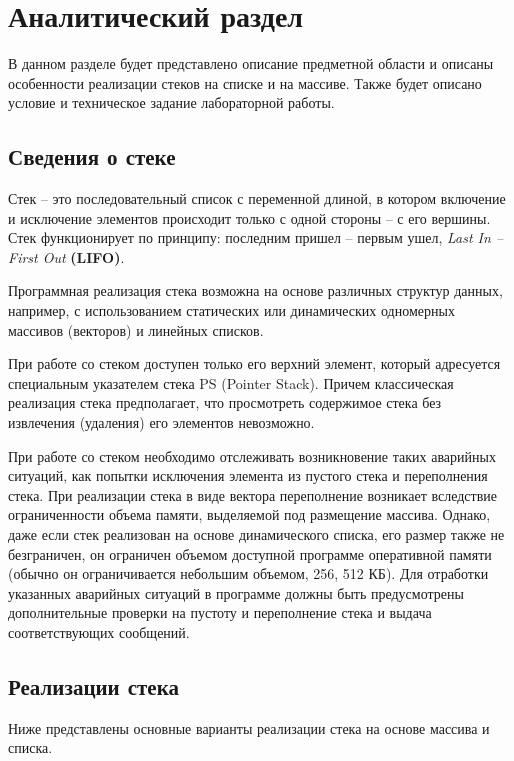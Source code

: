 \chapter{Аналитический раздел}

В данном разделе будет представлено описание предметной области и описаны особенности реализации стеков на списке и на массиве. Также будет описано условие и техническое задание лабораторной работы.

\section{Сведения о стеке}

Стек – это последовательный список с переменной длиной, в котором включение и 
исключение элементов  происходит  только с одной стороны  –  с его вершины. Стек 
функционирует по принципу: последним пришел –  первым ушел, \textit{Last In  –  First  Out} 
\textbf{(LIFO)}. 

Программная реализация стека возможна на основе различных структур данных, 
например,  с  использованием  статических  или  динамических  одномерных  массивов 
(векторов) и линейных списков.  

При работе со стеком доступен только его верхний элемент, который  адресуется 
специальным указателем  стека PS  (Pointer  Stack). Причем классическая реализация стека 
предполагает,  что  просмотреть  содержимое  стека  без  извлечения  (удаления)  его 
элементов невозможно.  

При работе со стеком необходимо отслеживать возникновение таких аварийных 
ситуаций, как попытки исключения элемента из пустого стека и переполнения стека. При 
реализации стека в  виде вектора переполнение возникает  вследствие ограниченности 
объема памяти, выделяемой под размещение массива. Однако, даже если стек реализован 
на основе динамического списка, его размер также не безграничен, он ограничен объемом 
доступной  программе  оперативной  памяти  (обычно  он  ограничивается  небольшим 
объемом,  256,  512  КБ).  Для  отработки  указанных  аварийных  ситуаций  в  программе 
должны быть предусмотрены дополнительные проверки на пустоту и переполнение стека 
и выдача соответствующих сообщений. 

\section{Реализации стека}

Ниже представлены основные варианты реализации стека на основе массива и списка.


